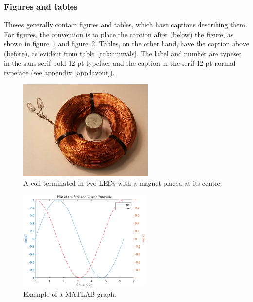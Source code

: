 \documentclass[english, 12pt, a4paper, elec, utf8, a-2b, online]{aaltothesis}
\begin{document}
\subsubsection{Figures and tables}

Theses generally contain figures and tables, which have captions describing 
them. For figures, the convention is to place the caption after (below) the 
figure, as shown in figure~\ref{fig:coil} and figure~\ref{fig:graph}. Tables, on
the other hand, have the caption above (before), as evident from 
table~\ref{tab:animals}. The label and number are typeset in the sans serif bold
12-pt typeface and the caption in the serif 12-pt normal typeface (see 
appendix~\ref{app:layout}).

\begin{figure}[tb]
  \centering
  \includegraphics[height=5cm]{./ledspole.jpg}
  \caption{A coil terminated in two LEDs with a magnet placed at its centre.}
  \label{fig:coil}
\end{figure}

\begin{figure}[tb]
  \centering
  \includegraphics[height=5cm]{curves.pdf}
  \caption{Example of a MATLAB graph.}
  \label{fig:graph}
\end{figure}
\end{document}
